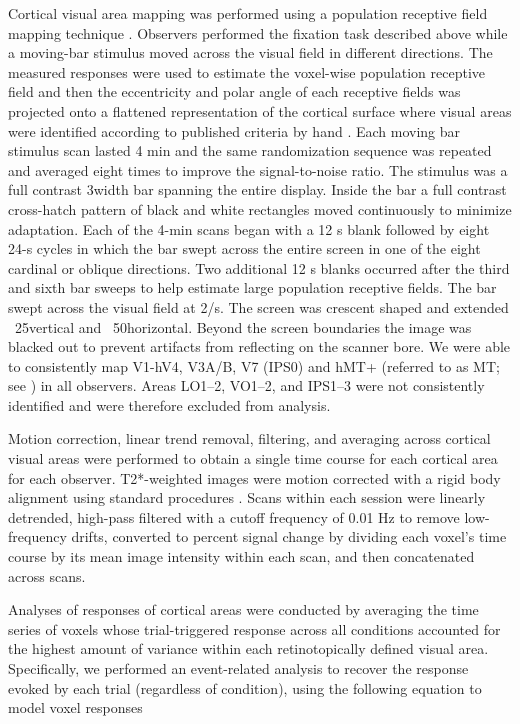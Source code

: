 Cortical visual area mapping was performed using a population receptive field mapping technique \citep{Dumoulin2008-uc}. Observers performed the fixation task described above while a moving-bar stimulus moved across the visual field in different directions. The measured responses were used to estimate the voxel-wise population receptive field and then the eccentricity and polar angle of each receptive fields was projected onto a flattened representation of the cortical surface where visual areas were identified according to published criteria by hand \citep{Gardner2008-yx,Wandell2007-pr}. Each moving bar stimulus scan lasted 4 min and the same randomization sequence was repeated and averaged eight times to improve the signal-to-noise ratio. The stimulus was a full contrast 3\degree width bar spanning the entire display. Inside the bar a full contrast cross-hatch pattern of black and white rectangles moved continuously to minimize adaptation. Each of the 4-min scans began with a 12 s blank followed by eight 24-s cycles in which the bar swept across the entire screen in one of the eight cardinal or oblique directions. Two additional 12 s blanks occurred after the third and sixth bar sweeps to help estimate large population receptive fields. The bar swept across the visual field at 2\degree /s. The screen was crescent shaped and extended ~25\degree vertical and ~50\degree horizontal. Beyond the screen boundaries the image was blacked out to prevent artifacts from reflecting on the scanner bore. We were able to consistently map V1-hV4, V3A/B, V7 (IPS0) and hMT+ (referred to as MT; see \citet{Huk2002-wq,Amano2009-ob}) in all observers. Areas LO1–2, VO1–2, and IPS1–3 were not consistently identified and were therefore excluded from analysis.

Motion correction, linear trend removal, filtering, and averaging across cortical visual areas were performed to obtain a single time course for each cortical area for each observer. T2*-weighted images were motion corrected with a rigid body alignment using standard procedures \citep{Nestares2000-by}. Scans within each session were linearly detrended, high-pass filtered with a cutoff frequency of 0.01 Hz to remove low-frequency drifts, converted to percent signal change by dividing each voxel’s time course by its mean image intensity within each scan, and then concatenated across scans.

Analyses of responses of cortical areas were conducted by averaging the time series of voxels whose trial-triggered response across all conditions accounted for the highest amount of variance within each retinotopically defined visual area. Specifically, we performed an event-related analysis to recover the response evoked by each trial (regardless of condition), using the following equation to model voxel responses

